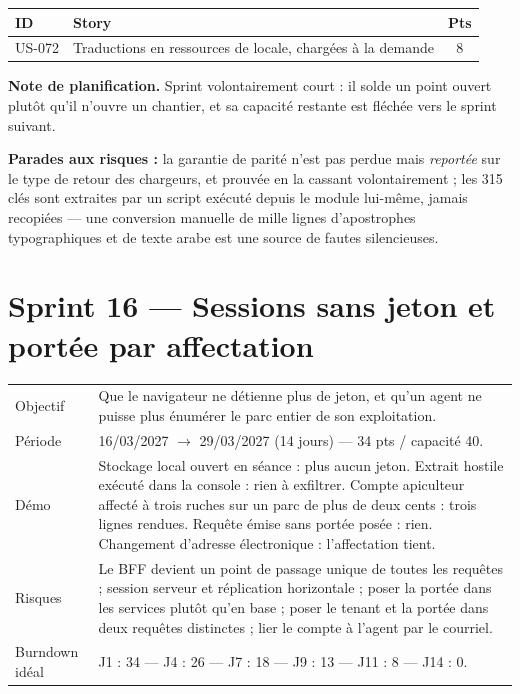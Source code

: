 \begin{center}
\begin{tabular}{lp{9cm}c}
\toprule
\textbf{ID} & \textbf{Story} & \textbf{Pts} \\
\midrule
US-072 & Traductions en ressources de locale, chargées à la demande & 8 \\
\bottomrule
\end{tabular}
\end{center}

\textbf{Note de planification.} Sprint volontairement court : il solde un point
ouvert plutôt qu'il n'ouvre un chantier, et sa capacité restante est fléchée
vers le sprint suivant.

\textbf{Parades aux risques :} la garantie de parité n'est pas perdue mais
\emph{reportée} sur le type de retour des chargeurs, et prouvée en la cassant
volontairement ; les 315 clés sont extraites par un script exécuté depuis le
module lui-même, jamais recopiées --- une conversion manuelle de mille lignes
d'apostrophes typographiques et de texte arabe est une source de fautes
silencieuses.

\section{Sprint 16 --- Sessions sans jeton et portée par affectation}

\begin{center}
\begin{tabular}{lp{11cm}}
\toprule
Objectif  & Que le navigateur ne détienne plus de jeton, et qu'un agent ne
            puisse plus énumérer le parc entier de son exploitation. \\
Période   & 16/03/2027 $\rightarrow$ 29/03/2027 (14 jours) --- 34 pts / capacité 40. \\
Démo      & Stockage local ouvert en séance : plus aucun jeton. Extrait hostile
            exécuté dans la console : rien à exfiltrer. Compte apiculteur
            affecté à trois ruches sur un parc de plus de deux cents : trois
            lignes rendues. Requête émise sans portée posée : rien. Changement
            d'adresse électronique : l'affectation tient. \\
Risques   & Le BFF devient un point de passage unique de toutes les requêtes ;
            session serveur et réplication horizontale ; poser la portée dans
            les services plutôt qu'en base ; poser le tenant et la portée dans
            deux requêtes distinctes ; lier le compte à l'agent par le courriel. \\
Burndown idéal & J1 : 34 --- J4 : 26 --- J7 : 18 --- J9 : 13 --- J11 : 8 --- J14 : 0. \\
\bottomrule
\end{tabular}
\end{center}


